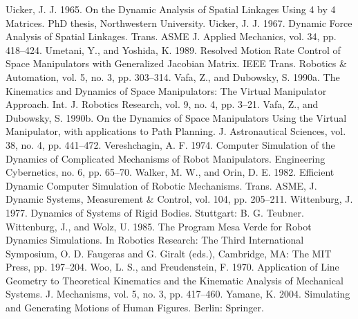 Uicker, J. J. 1965. On the Dynamic Analysis of Spatial Linkages Using 4 by 4 Matrices. PhD thesis, Northwestern University. Uicker, J. J. 1967. Dynamic Force Analysis of Spatial Linkages. Trans. ASME J. Applied Mechanics, vol. 34, pp. 418–424. Umetani, Y., and Yoshida, K. 1989. Resolved Motion Rate Control of Space Manipulators with Generalized Jacobian Matrix. IEEE Trans. Robotics \& Automation, vol. 5, no. 3, pp. 303–314. Vafa, Z., and Dubowsky, S. 1990a. The Kinematics and Dynamics of Space Manipulators: The Virtual Manipulator Approach. Int. J. Robotics Research, vol. 9, no. 4, pp. 3–21. Vafa, Z., and Dubowsky, S. 1990b. On the Dynamics of Space Manipulators Using the Virtual Manipulator, with applications to Path Planning. J. Astronautical Sciences, vol. 38, no. 4, pp. 441–472. Vereshchagin, A. F. 1974. Computer Simulation of the Dynamics of Complicated Mechanisms of Robot Manipulators. Engineering Cybernetics, no. 6, pp. 65–70. Walker, M. W., and Orin, D. E. 1982. Efficient Dynamic Computer Simulation of Robotic Mechanisms. Trans. ASME, J. Dynamic Systems, Measurement \& Control, vol. 104, pp. 205–211. Wittenburg, J. 1977. Dynamics of Systems of Rigid Bodies. Stuttgart: B. G. Teubner. Wittenburg, J., and Wolz, U. 1985. The Program Mesa Verde for Robot Dynamics Simulations. In Robotics Research: The Third International Symposium, O. D. Faugeras and G. Giralt (eds.), Cambridge, MA: The MIT Press, pp. 197–204. Woo, L. S., and Freudenstein, F. 1970. Application of Line Geometry to Theoretical Kinematics and the Kinematic Analysis of Mechanical Systems. J. Mechanisms, vol. 5, no. 3, pp. 417–460. Yamane, K. 2004. Simulating and Generating Motions of Human Figures. Berlin: Springer.

